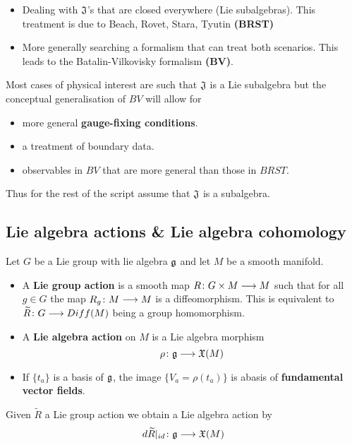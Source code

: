\begin{itemize}
  \item Dealing with $\mathfrak{J}$'s that are closed everywhere (Lie subalgebras). This treatment is due to Beach, Rovet, Stara, Tyutin \textbf{(BRST)}
  \item More generally searching a formalism that can treat both scenarios. This leads to the Batalin-Vilkovisky formalism \textbf{(BV)}.
\end{itemize}

Most cases of physical interest are such that $\mathfrak{J}$ is a Lie subalgebra but the conceptual generalisation of $BV$ will allow for
\begin{itemize}
  \item more general \textbf{gauge-fixing conditions}.
  \item a treatment of boundary data.
  \item observables in $BV$ that are more general than those in $BRST$.
\end{itemize}

Thus for the rest of the script assume that $\mathfrak{J}$ is a subalgebra.



\subsection{Lie algebra actions \& Lie algebra cohomology}

\begin{definition}
  Let $G$ be a Lie group with lie algebra $\mathfrak{g}$ and let $M$ be a smooth manifold.
  \begin{itemize}
    \item A  \textbf{Lie group action} is a smooth map $R\colon G \times M \longrightarrow M$ such that for all $g \in G$ the map $R_g \colon M \longrightarrow M$ is a diffeomorphism. This is equivalent to $\widetilde{R} \colon G \longrightarrow Diff(M)$ being a group homomorphism.

    \item A \textbf{Lie algebra action} on $M$ is a Lie algebra morphism
    $$ \rho \colon \mathfrak{g} \longrightarrow \mathfrak{X}(M) $$

    \item If $\{t_a\}$ is a basis of $\mathfrak{g}$, the image $\{V_a = \rho(t_a)\}$ is abasis of \textbf{fundamental vector fields}.
  \end{itemize}
\end{definition}

\begin{example}
  Given $\widetilde{R}$ a Lie group action we obtain a Lie algebra action by
  $$ d \widetilde{R} |_{id} \colon \mathfrak{g} \longrightarrow \mathfrak{X}(M) $$
\end{example}

